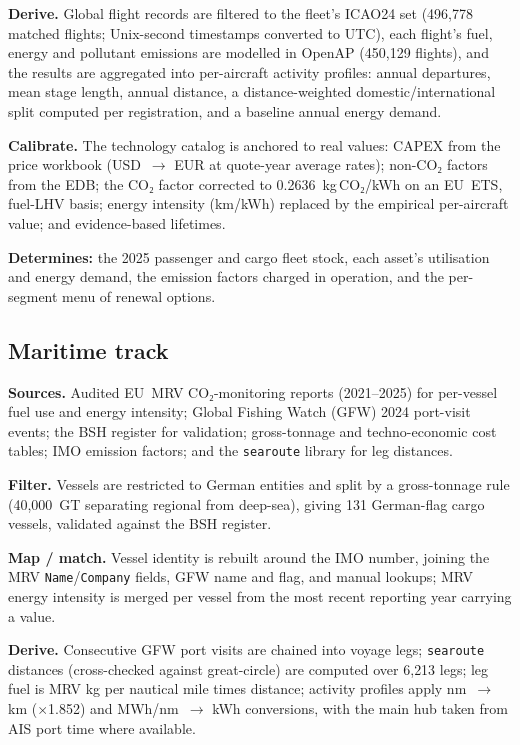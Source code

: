 \documentclass[11pt,a4paper]{article}
\begin{document}
\textbf{Derive.} Global flight records are filtered to the fleet's ICAO24 set (496{,}778 matched flights; Unix-second timestamps converted to UTC), each flight's fuel, energy and pollutant emissions are modelled in OpenAP (450{,}129 flights), and the results are aggregated into per-aircraft activity profiles: annual departures, mean stage length, annual distance, a distance-weighted domestic/international split computed per registration, and a baseline annual energy demand.

\textbf{Calibrate.} The technology catalog is anchored to real values: CAPEX from the price workbook (USD~$\rightarrow$ EUR at quote-year average rates); non-CO₂ factors from the EDB; the CO₂ factor corrected to 0.2636~kg\,CO₂/kWh on an EU~ETS, fuel-LHV basis; energy intensity (km/kWh) replaced by the empirical per-aircraft value; and evidence-based lifetimes.

\textbf{Determines:} the 2025 passenger and cargo fleet stock, each asset's utilisation and energy demand, the emission factors charged in operation, and the per-segment menu of renewal options.

\subsection*{Maritime track}

\textbf{Sources.} Audited EU~MRV CO₂-monitoring reports (2021--2025) for per-vessel fuel use and energy intensity; Global Fishing Watch (GFW) 2024 port-visit events; the BSH register for validation; gross-tonnage and techno-economic cost tables; IMO emission factors; and the \texttt{searoute} library for leg distances.

\textbf{Filter.} Vessels are restricted to German entities and split by a gross-tonnage rule (40{,}000~GT separating regional from deep-sea), giving 131 German-flag cargo vessels, validated against the BSH register.

\textbf{Map / match.} Vessel identity is rebuilt around the IMO number, joining the MRV \texttt{Name}/\texttt{Company} fields, GFW name and flag, and manual lookups; MRV energy intensity is merged per vessel from the most recent reporting year carrying a value.

\textbf{Derive.} Consecutive GFW port visits are chained into voyage legs; \texttt{searoute} distances (cross-checked against great-circle) are computed over 6{,}213 legs; leg fuel is MRV kg per nautical mile times distance; activity profiles apply nm~$\rightarrow$ km ($\times$1.852) and MWh/nm~$\rightarrow$ kWh conversions, with the main hub taken from AIS port time where available.
\end{document}
